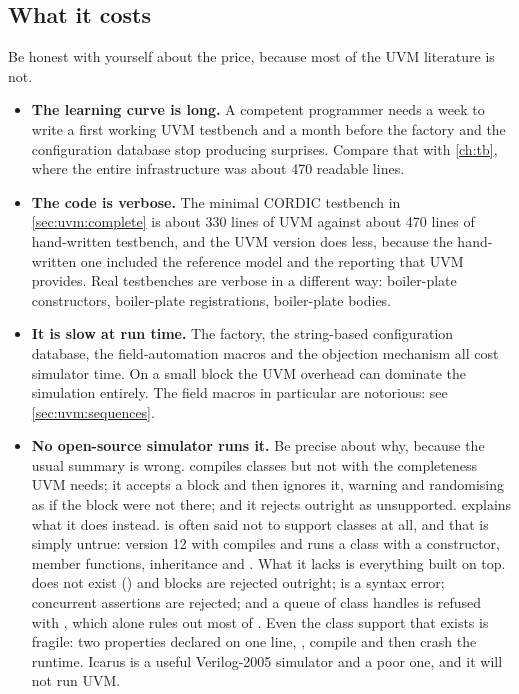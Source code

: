\subsection{What it costs}
\label{sec:uvm:cost}

Be honest with yourself about the price, because most of the UVM literature
is not.

\begin{itemize}
  \item \textbf{The learning curve is long.} A competent \SV{} programmer
        needs a week to write a first working UVM testbench and a month
        before the factory and the configuration database stop producing
        surprises. Compare that with \cref{ch:tb}, where the entire
        infrastructure was about 470 readable lines.
  \item \textbf{The code is verbose.} The minimal CORDIC testbench in
        \cref{sec:uvm:complete} is about 330 lines of UVM against about 470 lines
        of hand-written testbench, and the UVM version does less, because
        the hand-written one included the reference model and the reporting
        that UVM provides. Real testbenches are verbose in a different way:
        boiler-plate constructors, boiler-plate registrations,
        boiler-plate  bodies.
  \item \textbf{It is slow at run time.} The factory, the string-based
        configuration database, the field-automation macros and the objection
        mechanism all cost simulator time. On a small block the UVM overhead
        can dominate the \RTL{} simulation entirely. The field macros in
        particular are notorious: see \cref{sec:uvm:sequences}.
  \item \textbf{No open-source simulator runs it.} Be precise about why,
        because the usual summary is wrong.  compiles classes
        but not with the completeness UVM needs; it accepts a
         block and then ignores it, warning
         and randomising as if the block were not there;
        and it rejects  outright as unsupported.
         explains what it does instead.
         is often said not to support classes at all, and
        that is simply untrue: version 12 with  compiles and runs
        a class with a constructor, member functions, inheritance and
        . What it lacks is everything built on top.
         does not exist () and  blocks are rejected outright;
         is a syntax error; concurrent
        assertions are rejected; and a queue of class handles is refused with
        , which alone rules
        out most of . Even the class support that exists is
        fragile: two properties declared on one line, , compile
        and then crash the runtime. Icarus is a useful Verilog-2005 simulator
        and a poor \SV{} one, and it will not run UVM.
\end{itemize}

